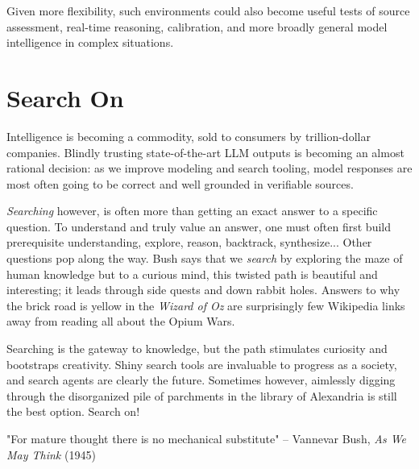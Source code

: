 Given more flexibility, such environments could also become useful tests of source assessment, real-time reasoning, calibration, and more broadly general model intelligence in complex situations.


\section*{Search On}

Intelligence is becoming a commodity, sold to consumers by trillion-dollar companies. Blindly trusting state-of-the-art LLM outputs is becoming an almost rational decision: as we improve modeling and search tooling, model responses are most often going to be correct and well grounded in verifiable sources.

\emph{Searching} however, is often more than getting an exact answer to a specific question. To understand and truly value an answer, one must often first build prerequisite understanding, explore, reason, backtrack, synthesize... Other questions pop along the way. Bush says that we \emph{search} by exploring the maze of human knowledge but to a curious mind, this twisted path is beautiful and interesting; it leads through side quests and down rabbit holes. Answers to why the brick road is yellow in the \emph{Wizard of Oz} are surprisingly few Wikipedia links away from reading all about the Opium Wars.

Searching is the gateway to knowledge, but the path stimulates curiosity and bootstraps creativity. Shiny search tools are invaluable to progress as a society, and search agents are clearly the future. Sometimes however, aimlessly digging through the disorganized pile of parchments in the library of Alexandria is still the best option. Search on!


 \begin{lavenderkaobox}
 "For mature thought there is no mechanical substitute"
	\flushright -- Vannevar Bush, \emph{As We May Think} (1945)
 \end{lavenderkaobox}



